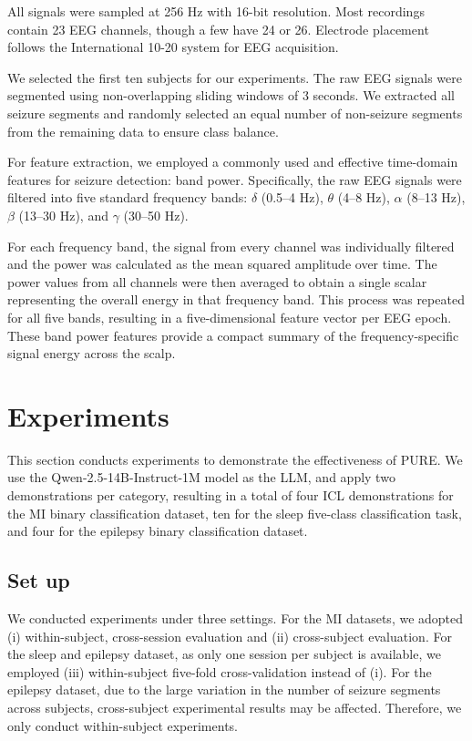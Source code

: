 \documentclass[journal,twocolumn]{IEEEtran}
\begin{document}
All signals were sampled at 256 Hz with 16-bit resolution. Most recordings contain 23 EEG channels, though a few have 24 or 26. Electrode placement follows the International 10-20 system for EEG acquisition.

We selected the first ten subjects for our experiments. The raw EEG signals were segmented using non-overlapping sliding windows of 3 seconds. We extracted all seizure segments and randomly selected an equal number of non-seizure segments from the remaining data to ensure class balance.

For feature extraction, we employed a commonly used and effective time-domain features for seizure detection: band power. Specifically, the raw EEG signals were filtered into five standard frequency bands: $\delta$ (0.5–4 Hz), $\theta$ (4–8 Hz), $\alpha$ (8–13 Hz), $\beta$ (13–30 Hz), and $\gamma$ (30–50 Hz). 

For each frequency band, the signal from every channel was individually filtered and the power was calculated as the mean squared amplitude over time. The power values from all channels were then averaged to obtain a single scalar representing the overall energy in that frequency band. This process was repeated for all five bands, resulting in a five-dimensional feature vector per EEG epoch. These band power features provide a compact summary of the frequency-specific signal energy across the scalp.

\section{Experiments}
\label{sec:exp}

This section conducts experiments to demonstrate the effectiveness of PURE. We use the Qwen-2.5-14B-Instruct-1M model as the LLM, and apply two demonstrations per category, resulting in a total of four ICL demonstrations for the MI binary classification dataset, ten for the sleep five-class classification task, and four for the epilepsy binary classification dataset.

\subsection{Set up}

We conducted experiments under three settings. For the MI datasets, we adopted (i) within-subject, cross-session evaluation and (ii) cross-subject evaluation. For the sleep and epilepsy dataset, as only one session per subject is available, we employed (iii) within-subject five-fold cross-validation instead of (i). For the epilepsy dataset, due to the large variation in the number of seizure segments across subjects, cross-subject experimental results may be affected. Therefore, we only conduct within-subject experiments.
\end{document}
